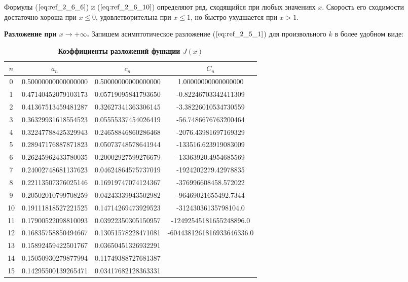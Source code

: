Формулы ($\ref{eq:ref_2_6_6}$) и ($\ref{eq:ref_2_6_10}$) определяют ряд, сходящийся при любых значениях $x$.
Скорость его сходимости достаточно хороша при $x \leqslant 0$, удовлетворительна при
$x \leqslant 1$, но быстро ухудшается при $x > 1$.

\textbf{Разложение при $x \to +\infty$.} Запишем асимптотическое разложение ($\ref{eq:ref_2_5_1}$) для
произвольного $k$ в более удобном виде:

\begin{table}[]
\caption{\textbf{Коэффициенты разложений функции $J(x)$}}
\begin{center}
\begin{tabular}{|c|c|c|c|}
\hline
$n$ & $a_n$ & $c_n$ & $C_n$ \\
\hline
0 & 0.50000000000000000 & 0.50000000000000000 & 1.00000000000000000 \\
1 & 0.47140452079103173 & 0.05719095841793650 & -0.82246703342411309 \\
2 & 0.41367513459481287 & 0.32627341363306145 & -3.38226010534730559 \\
3 & 0.36329931618554523 & 0.05555337454026419 & -56.7486676763200464 \\
4 & 0.32247788425329943 & 0.24658846860286468 & -2076.43981697169329 \\
5 & 0.28947176887871823 & 0.05073748578641944 & -133516.623919083009 \\
6 & 0.26245962433780035 & 0.20002927599276679 & -13363920.4954685569 \\
7 & 0.24002748681137623 & 0.04624864575737019 & -1924202279.42978835 \\
8 & 0.22113507376025146 & 0.16919747074124367 & -376996608458.572022 \\
9 & 0.20502010799708259 & 0.04243339943502982 & -96469021655492.7344 \\
10 & 0.19111818527221525 & 0.14714269473929523 & -31243036135798104.0  \\
11 & 0.17900522098810093 & 0.03922350305150957 & -12492545181655248896.0 \\
12 & 0.16835758850494667 & 0.13051578228471081 & -6044381261816933646336.0 \\
13 & 0.15892459422501767 & 0.03650451326932291 &                      \\
14 & 0.15050930279877994 & 0.11749388727681387 &                      \\
15 & 0.14295500139265471 & 0.03417682128363331 &                      \\

\end{tabular}
\end{center}
\end{table}
